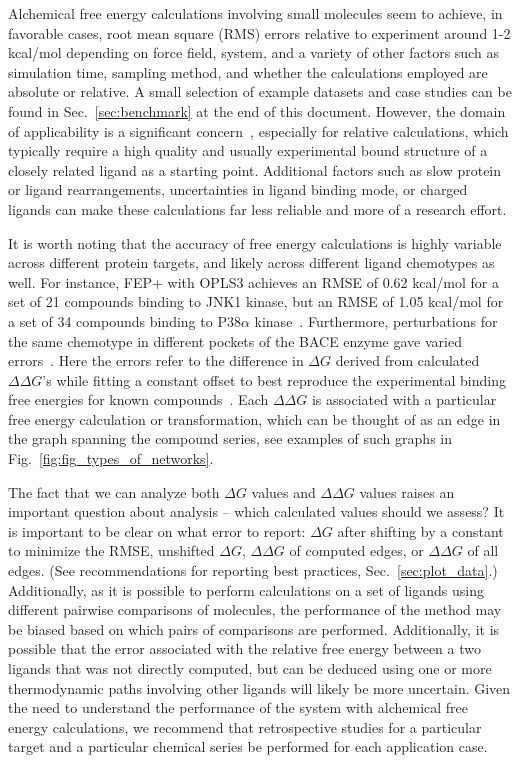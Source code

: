 \documentclass[9pt,bestpractices,pubversion]{livecoms}
\begin{document}
Alchemical free energy calculations involving small molecules seem to achieve, in favorable cases, root mean square (RMS) errors relative to experiment around 1-2 kcal/mol depending on force field, system, and a variety of other factors such as simulation time, sampling method, and whether the calculations employed are absolute or relative. A small selection of example datasets and case studies can be found in Sec.~\ref{sec:benchmark} at the end of this document.
However, the domain of applicability is a significant concern~\cite{sherborne2016collaborating, cournia2017relative}, especially for relative calculations, which typically require a high quality and usually experimental bound structure of a closely
related ligand as a starting point. Additional factors such as slow protein or ligand rearrangements, uncertainties in ligand binding mode, or charged ligands can make these calculations far less reliable and more of a research effort.


It is worth noting that the accuracy of free energy calculations is highly variable across different protein targets, and likely across different ligand chemotypes as well.
For instance, FEP+ with OPLS3 achieves an RMSE of 0.62 kcal/mol for a set of 21 compounds binding to JNK1 kinase, but an RMSE of 1.05 kcal/mol for a set of 34 compounds binding to P38$\alpha$ kinase~\cite{harder2016opls3}.
Furthermore, perturbations for the same chemotype in different pockets of the BACE enzyme gave varied errors~\cite{keranen2017acylguanidine}. Here the errors refer to the difference in $\Delta G$ derived from calculated $\Delta \Delta G$'s while fitting a constant offset to best reproduce the experimental binding free energies for known compounds~\cite{wang2015accurate}. Each $\Delta \Delta G$ is associated with a particular free energy calculation or transformation, which can be thought of as an edge in the graph spanning the compound series, see examples of such graphs in Fig.~\ref{fig:fig_types_of_networks}.

The fact that we can analyze both $\Delta G$ values and $\Delta \Delta G$ values raises an important question about analysis -- which calculated values should we assess? It is important to be clear on what error to report: $\Delta G$ after shifting by a constant to minimize the RMSE, unshifted $\Delta G$, $\Delta \Delta G$ of computed edges, or $\Delta \Delta G$ of all edges. (See recommendations for reporting best practices, Sec.~\ref{sec:plot_data}.) Additionally, as it is possible to perform calculations on a set of ligands using different pairwise comparisons of molecules, the performance of the method may be biased based on which pairs of comparisons are performed. Additionally, it is possible that the error associated with the relative free energy between a two ligands that was not directly computed,  but can be deduced using one or more thermodynamic paths involving other ligands will likely be more uncertain.
Given the need to understand the performance of the system with alchemical free energy calculations, we recommend that retrospective studies for a particular target and a particular chemical series be performed for each application case.
\end{document}
